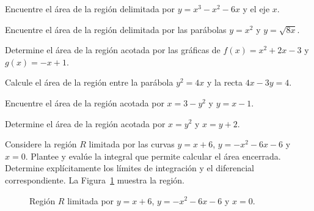 \begin{prob}
Encuentre el área de la región delimitada por $y = x^3 - x^2 - 6x$ y el eje $x$.
\end{prob}

\begin{prob}
Encuentre el área de la región delimitada por las parábolas $y = x^2$ y $y = \sqrt{8x}$.
\end{prob}

\begin{prob}
Determine el área de la región acotada por las gráficas de $f(x) = x^2 + 2x - 3$ y $g(x) = -x + 1$.
\end{prob}

\begin{prob}
Calcule el área de la región entre la parábola $y^2 = 4x$ y la recta $4x - 3y = 4$.
\end{prob}

\begin{prob}
Encuentre el área de la región acotada por $x = 3 - y^2$ y $y = x - 1$.
\end{prob}

\begin{prob}
Determine el área de la región acotada por $x = y^2$ y $x = y + 2$.
\end{prob}

\begin{prob}
Considere la región $R$ limitada por las curvas $y=x+6$, $y=-x^2-6x-6$ y $x=0$. Plantee y evalúe la integral que permite calcular el área encerrada. Determine explícitamente los límites de integración y el diferencial correspondiente.
La Figura~\ref{fig:prob_region_recta_parabola} muestra la región.

\begin{figure}[!htbp]
\centering
{}
\caption{Región $R$ limitada por $y=x+6$, $y=-x^2-6x-6$ y $x=0$.}
\label{fig:prob_region_recta_parabola}
\end{figure}
\end{prob}

